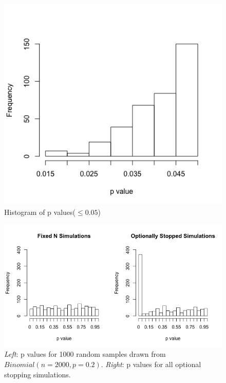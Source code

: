 \begin{figure}[h] 
\begin{center}
\includegraphics[scale=0.4]{freqstoppval.png}
	\caption{Histogram of p values($\leq 0.05$)}
	\label{fig:freqhistpval}
\end{center}	
\end{figure}

\begin{figure}[h] 
\begin{center}
\includegraphics[scale=0.5]{fixedvsoptional.png}
	\caption{\emph{Left}: p values for 1000 random samples drawn from $Binomial(n=2000,p=0.2)$. \emph{Right}: p values for all optional stopping simulations.}
	\label{fig:freqfixedvsoptional}
\end{center}	
\end{figure}

